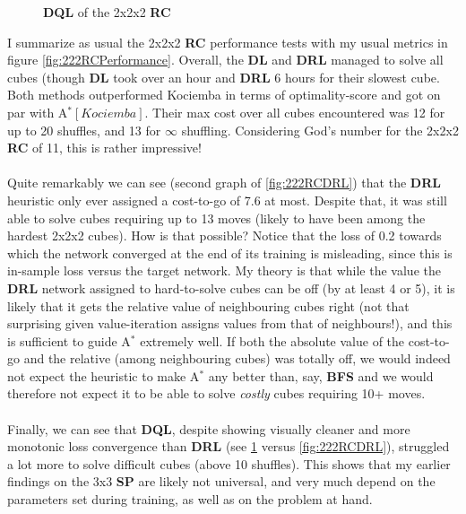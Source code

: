 \begin{figure}[H]
  \noindent
  \caption[222RCDQL]{\textbf{DQL} of the 2x2x2 \textbf{RC}}
  \label{fig:222RCDQL}
\end{figure}





I summarize as usual the 2x2x2 \textbf{RC} performance tests with my usual metrics in figure \ref{fig:222RCPerformance}. Overall, the \textbf{DL} and \textbf{DRL} managed to solve all cubes (though \textbf{DL} took over an hour and \textbf{DRL} 6 hours for their slowest cube. Both methods outperformed Kociemba in terms of optimality-score and got on par with A$^{*}[Kociemba]$. Their max cost over all cubes encountered was 12 for up to 20 shuffles, and 13 for $\infty$ shuffling. Considering God's number for the 2x2x2 \textbf{RC} of 11, this is rather impressive!
\\
\\
Quite remarkably we can see (second graph of \ref{fig:222RCDRL}) that the \textbf{DRL} heuristic only ever assigned a cost-to-go of 7.6 at most. Despite that, it was still able to solve cubes requiring up to 13 moves (likely to have been among the hardest 2x2x2 cubes). How is that possible? Notice that the loss of 0.2 towards which the network converged at the end of its training is misleading, since this is in-sample loss versus the target network. My theory is that while the value the \textbf{DRL} network assigned to hard-to-solve cubes can be off (by at least 4 or 5), it is likely that it gets the relative value of neighbouring cubes right (not that surprising given value-iteration assigns values from that of neighbours!), and this is sufficient to guide A$^{*}$ extremely well. If both the absolute value of the cost-to-go and the relative (among neighbouring cubes) was totally off, we would indeed not expect the heuristic to make A$^{*}$ any better than, say, \textbf{BFS} and we would therefore not expect it to be able to solve \textit{costly} cubes requiring 10+ moves.
\\
\\
Finally, we can see that \textbf{DQL}, despite showing visually cleaner and more monotonic loss convergence than \textbf{DRL} (see \ref{fig:222RCDQL} versus \ref{fig:222RCDRL}), struggled a lot more to solve difficult cubes (above 10 shuffles). This shows that my earlier findings on the 3x3 \textbf{SP} are likely not universal, and very much depend on the parameters set during training, as well as on the problem at hand.


